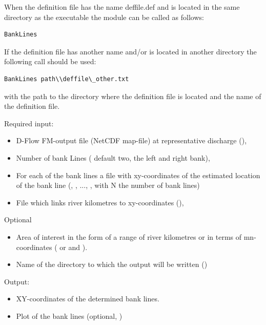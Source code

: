 When the definition file has the name deffile.def and is located in the same directory as the executable the module can be called as follows:

\begin{Verbatim}
BankLines
\end{Verbatim}

If the definition file has another name and/or is located in another directory the following call should be used:

\begin{Verbatim}
BankLines path\\deffile\_other.txt
\end{Verbatim}

with  the path to the directory where the definition file is located and  the name of the definition file.

Required input:

\begin{itemize}
\item D-Flow FM-output file (NetCDF map-file) at representative discharge (),
\item Number of bank Lines ( default two, the left and right bank),
\item For each of the bank lines a file with xy-coordinates of the estimated location of the bank line (, , ..., , with N the number of bank lines)
\item File which links river kilometres to xy-coordinates (),
\end{itemize}


Optional

\begin{itemize}
\item Area of interest in the form of a range of river kilometres or in terms of mn-coordinates ( or  and ).
\item Name of the directory to which the output will be written ()
\end{itemize}

Output:

\begin{itemize}
\item XY-coordinates of the determined bank lines.
\item Plot of the bank lines (optional, )
\end{itemize}

